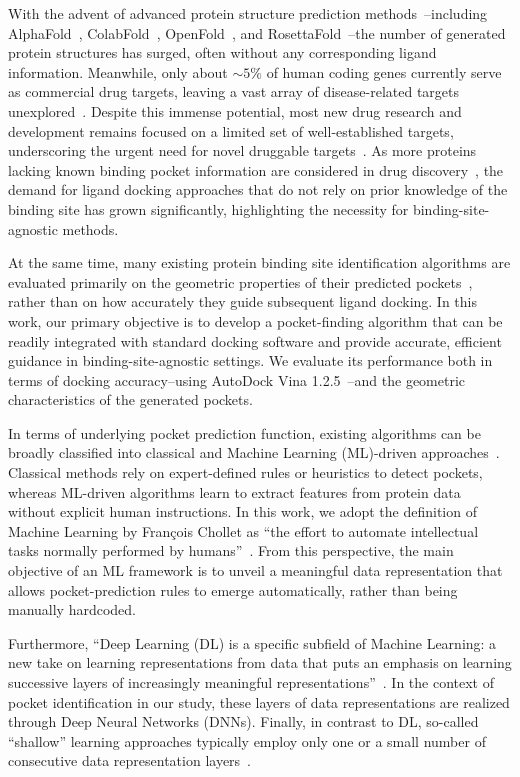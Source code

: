\documentclass[10pt,conference]{IEEEtran}
\begin{document}
With the advent of advanced protein structure prediction methods~\cite{shen2022predicting}--including AlphaFold~\cite{jumper2021highly}, ColabFold~\cite{mirdita2022colabfold}, OpenFold~\cite{ahdritz2024openfold}, and RosettaFold~\cite{baek2021accurate}--the number of generated protein structures has surged, often without any corresponding ligand information. Meanwhile, only about $\sim 5\%$ of human coding genes currently serve as commercial drug targets, leaving a vast array of disease-related targets unexplored~\cite{overington2006many}. Despite this immense potential, most new drug research and development remains focused on a limited set of well-established targets, underscoring the urgent need for novel druggable targets~\cite{santos2017comprehensive}. As more proteins lacking known binding pocket information are considered in drug discovery~\cite{huang2023dsdp}, the demand for ligand docking approaches that do not rely on prior knowledge of the binding site has grown significantly, highlighting the necessity for binding-site-agnostic methods.


At the same time, many existing protein binding site identification algorithms are evaluated primarily on the geometric properties of their predicted pockets~\cite{utges2024comparative}, rather than on how accurately they guide subsequent ligand docking. In this work, our primary objective is to develop a pocket-finding algorithm that can be readily integrated with standard docking software and provide accurate, efficient guidance in binding-site-agnostic settings. We evaluate its performance both in terms of docking accuracy--using AutoDock Vina 1.2.5~\cite{eberhardt2021autodock}--and the geometric characteristics of the generated pockets.

In terms of underlying pocket prediction function, existing algorithms can be broadly classified into classical and Machine Learning (ML)-driven approaches~\cite{utges2024comparative}. Classical methods rely on expert-defined rules or heuristics to detect pockets, whereas ML-driven algorithms learn to extract features from protein data without explicit human instructions. In this work, we adopt the definition of Machine Learning by François Chollet as ``the effort to automate intellectual tasks normally performed by humans''~\cite{chollet2021deep}. From this perspective, the main objective of an ML framework is to unveil a meaningful data representation that allows pocket-prediction rules to emerge automatically, rather than being manually hardcoded.

Furthermore, ``Deep Learning (DL) is a specific subfield of Machine Learning: a new take on learning representations from data that puts an emphasis on learning successive layers of increasingly meaningful representations''~\cite{chollet2021deep}. In the context of pocket identification in our study, these layers of data representations are realized through Deep Neural  Networks (DNNs). Finally, in contrast to DL, so-called ``shallow'' learning approaches typically employ only one or a small number of consecutive data representation layers~\cite{chollet2021deep}.
\end{document}
